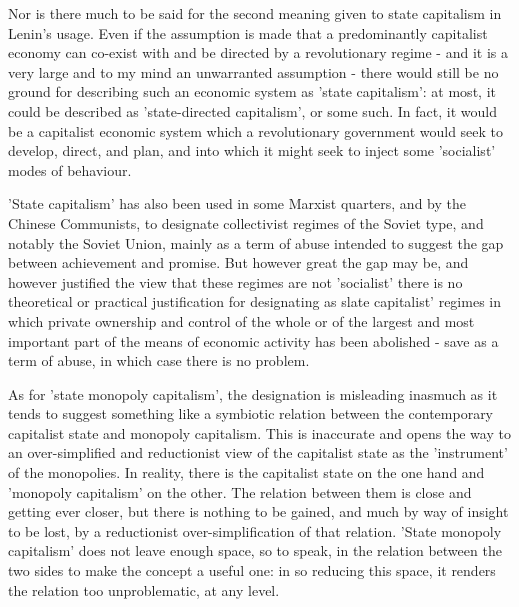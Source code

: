 Nor is there much to be said for the second meaning given to state capitalism in Lenin's usage. Even if the assumption is made that a predominantly capitalist economy can co-exist with and be directed by a revolutionary regime - and it is a very large and to my mind an unwarranted assumption - there would still be no ground for describing such an economic system as 'state capitalism': at most, it could be described as 'state-directed capitalism', or some such. In fact, it would be a capitalist economic system which a revolutionary government would seek to develop, direct, and plan, and into which it might seek to inject some 'socialist' modes of behaviour.

'State capitalism' has also been used in some Marxist quarters, and by the Chinese Communists, to designate collectivist regimes of the Soviet type, and notably the Soviet Union, mainly as a term of abuse intended to suggest the gap between achievement and promise. But however great the gap may be, and however justified the view that these regimes are not 'socialist' there is no theoretical or practical justification for designating as slate capitalist' regimes in which private ownership and control of the whole or of the largest and most important part of the means of economic activity has been abolished - save as a term of abuse, in which case there is no problem.

As for 'state monopoly capitalism', the designation is misleading inasmuch as it tends to suggest something like a symbiotic relation between the contemporary capitalist state and monopoly capitalism. This is inaccurate and opens the way to an over\hyp{}simplified and reductionist view of the capitalist state as the 'instrument' of the monopolies. In reality, there is the capitalist state on the one hand and 'monopoly capitalism' on the other. The relation between them is close and getting ever closer, but there is nothing to be gained, and much by way of insight to be lost, by a reductionist over-simplification of that relation. 'State monopoly capitalism' does not leave enough space, so to speak, in the relation between the two sides to make the concept a useful one: in so reducing this space, it renders the relation too unproblematic, at any level.

